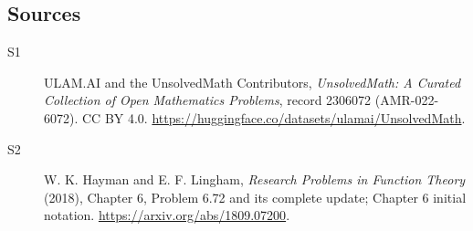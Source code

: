 \documentclass[11pt]{article}
\begin{document}
\subsection{Sources}
\begin{description}
\item[\hypertarget{source:2306072:1}{S1}] ULAM.AI and the UnsolvedMath Contributors, \emph{UnsolvedMath: A Curated Collection of Open Mathematics Problems}, record 2306072 (AMR-022-6072). CC BY 4.0. \url{https://huggingface.co/datasets/ulamai/UnsolvedMath}.
\item[\hypertarget{source:2306072:2}{S2}] W. K. Hayman and E. F. Lingham, \emph{Research Problems in Function Theory} (2018), Chapter 6, Problem 6.72 and its complete update; Chapter 6 initial notation. \url{https://arxiv.org/abs/1809.07200}.
\end{description}
\label{end:2306072}
\end{document}
